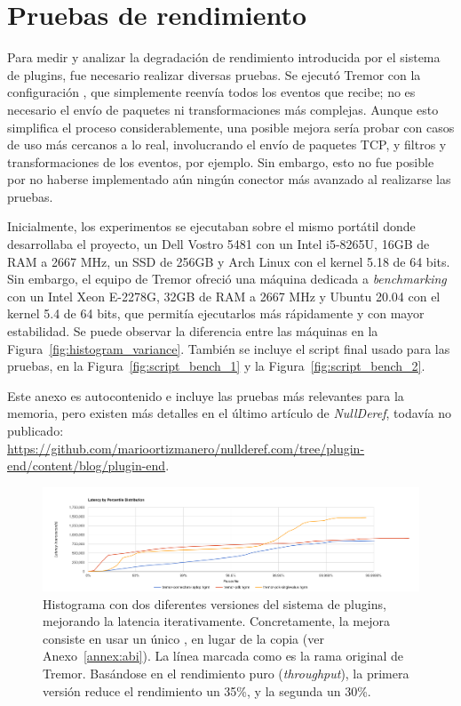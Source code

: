 \chapter{Pruebas de rendimiento}\label{annex:benchmarks}

Para medir y analizar la degradación de rendimiento introducida por el sistema
de plugins, fue necesario realizar diversas pruebas. Se ejecutó Tremor con la
configuración , que simplemente reenvía todos los eventos que
recibe; no es necesario el envío de paquetes ni transformaciones más complejas.
Aunque esto simplifica el proceso considerablemente, una posible mejora sería
probar con casos de uso más cercanos a lo real, involucrando el envío de
paquetes TCP, y filtros y transformaciones de los eventos, por ejemplo. Sin
embargo, esto no fue posible por no haberse implementado aún ningún conector más
avanzado al realizarse las pruebas.

Inicialmente, los experimentos se ejecutaban sobre el mismo portátil donde
desarrollaba el proyecto, un Dell Vostro 5481 con un Intel i5-8265U, 16GB de RAM
a 2667 MHz, un SSD de 256GB y Arch Linux con el kernel 5.18 de 64 bits. Sin
embargo, el equipo de Tremor ofreció una máquina dedicada a \emph{benchmarking}
con un Intel Xeon E-2278G, 32GB de RAM a 2667 MHz y Ubuntu 20.04 con el kernel
5.4 de 64 bits, que permitía ejecutarlos más rápidamente y con mayor
estabilidad. Se puede observar la diferencia entre las máquinas en la
Figura~\ref{fig:histogram_variance}. También se incluye el script final usado
para las pruebas, en la Figura~\ref{fig:script_bench_1} y la
Figura~\ref{fig:script_bench_2}.

Este anexo es autocontenido e incluye las pruebas más relevantes para la
memoria, pero existen más detalles en el último artículo de \emph{NullDeref},
todavía no publicado:\\
\url{https://github.com/marioortizmanero/nullderef.com/tree/plugin-end/content/blog/plugin-end}.

\begin{figure}
    \centering
    \includegraphics[width=\textwidth]{./Imagenes/histogram_pdk.png}
    \caption{Histograma con dos diferentes versiones del sistema de plugins,
    mejorando la latencia iterativamente. Concretamente, la mejora consiste en
    usar un único , en lugar de la copia  (ver
    Anexo~\ref{annex:abi}). La línea marcada como
     es la rama original de Tremor. Basándose en
    el rendimiento puro (\emph{throughput}), la primera versión reduce el
    rendimiento un 35\%, y la segunda un 30\%.}%
    \label{fig:histogram_pdk}
\end{figure}

